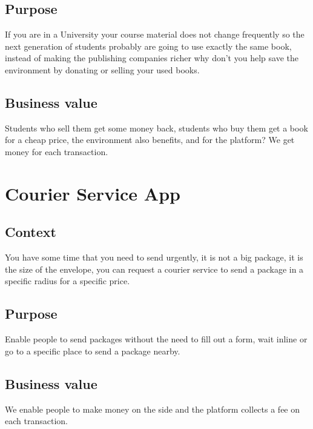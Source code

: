 \documentclass[12pt]{article}
\begin{document}
\subsection{Purpose}
If you are in a University your course material does not change frequently so 
the next generation of students probably are going to use exactly the same 
book, instead of making the publishing companies richer why don’t you help 
save the environment by donating or selling your used books.

\subsection{Business value}
Students who sell them get some money back, students who buy them get a book 
for a cheap price, the environment also benefits, and for the platform? We get 
money for each transaction.

\pagebreak

\section{Courier Service App}
\subsection{Context}
You have some time that you need to send urgently,  it is not a big package,  
it is the size of the envelope, you can request a courier service to send a 
package in a specific radius for a specific price.

\subsection{Purpose}
Enable people to send packages without the need to fill out a form, wait 
inline or go to a specific place to send a package nearby.

\subsection{Business value}
We enable people to make money on the side and the platform collects a 
fee on each transaction.
\end{document}
